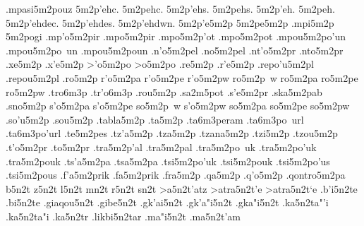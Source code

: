 {.mpasi5m2pouz %
5m2p'ehc.    %
5m2pehc.
5m2p'ehs.
5m2pehs.
5m2p'eh.
5m2peh.
5m2p'ehdec.
5m2p'ehdes.
5m2p'ehdwn.
5m2p'e5m2p   %
5m2pe5m2p
.mpi5m2p     %
5m2pogi      %
.mp'o5m2pir  %
.mpo5m2pir   %
.mpo5m2p'ot  %
.mpo5m2pot
.mpou5m2po'un %
.mpou5m2po~un 
.mpou5m2poun 
.n'o5m2pel   %
.no5m2pel    
.nt'o5m2pr   %
.nto5m2pr
.xe5m2p      %
.x'e5m2p
>'o5m2po     %
>o5m2po
.re5m2p      %
.r'e5m2p     %
.repo'u5m2pl %
.repou5m2pl  %
.ro5m2p      %
r'o5m2pa     %
r'o5m2pe
r'o5m2pw
ro5m2p~w
ro5m2pa
ro5m2pe
ro5m2pw
  .tro6m3p	 %
  .tr'o6m3p      %
.rou5m2p     %
.sa2m5pot    %
.s'e5m2pr    %
.ska5m2pab   %
.sno5m2p     %
s'o5m2pa     %
s'o5m2pe
so5m2p~w
s'o5m2pw
so5m2pa
so5m2pe
so5m2pw
.so'u5m2p    %
.sou5m2p
.tabla5m2p   %
.ta5m2p      %
  .ta6m3peram  %
  .ta6m3po~url %
  .ta6m3po'url
.te5m2pes    %
.tz'a5m2p    %
.tza5m2p
.tzana5m2p   %
.tzi5m2p     %
.tzou5m2p    %
.t'o5m2pr    %
.to5m2pr
.tra5m2p'al  %
.tra5m2pal
.tra5m2po~uk %
.tra5m2po'uk
.tra5m2pouk
.ts'a5m2pa   %
.tsa5m2pa
.tsi5m2po'uk %
.tsi5m2pouk
.tsi5m2po'us %
.tsi5m2pous
.f'a5m2prik  %
.fa5m2prik
.fra5m2p     %
.qa5m2p      %
.q'o5m2p     %
.qontro5m2pa %
b5n2t
z5n2t
l5n2t
mn2t
r5n2t
sn2t
>a5n2t'atz   %
>atra5n2t'e  %
>atra5n2t`e
.b'i5n2te    %
.bi5n2te
.giaqou5n2t  %
.gibe5n2t    %
.gk'ai5n2t   %
.gk'a"i5n2t
.gka"i5n2t
.ka5n2ta"'i  %
.ka5n2ta"i
.ka5n2tr     %
.likbi5n2tar %
.ma"i5n2t    %
.ma5n2t'am   %
}

